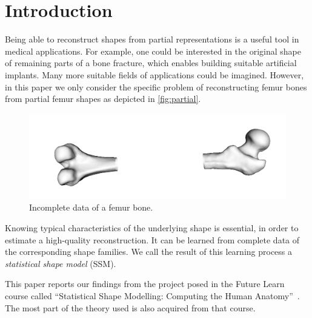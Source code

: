 \section{Introduction}
\label{sec:intro}


Being able to reconstruct shapes from partial representations is a useful tool in medical applications.
For example, one could be interested in the original shape of remaining parts of a bone fracture, which enables building suitable artificial implants.
Many more suitable fields of applications could be imagined.
However, in this paper we only consider the specific problem of reconstructing femur bones from partial femur shapes as depicted in \autoref{fig:partial}.
\begin{figure}[b]
	\centering
  \includegraphics[scale=.15]{./Figures/partial_femur}
  \caption{Incomplete data of a femur bone.}
  \label{fig:partial}
\end{figure}

Knowing typical characteristics of the underlying shape is essential, in order to estimate a high-quality reconstruction.
It can be learned from complete data of the corresponding shape families.
We call the result of this learning process a \emph{statistical shape model} (SSM).

This paper reports our findings from the project posed in the Future Learn course called ``Statistical Shape Modelling: Computing the Human Anatomy''~\cite{mooc2019statistical}.
The most part of the theory used is also acquired from that course.
